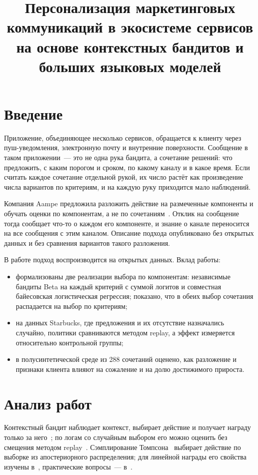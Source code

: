 \documentclass{misisarticle}
\title{Персонализация маркетинговых коммуникаций в экосистеме сервисов на основе контекстных бандитов и больших языковых моделей}
\begin{document}
\maketitle

\section{Введение}

Приложение, объединяющее несколько сервисов, обращается к клиенту через пуш-уведомления, электронную почту и внутренние поверхности. Сообщение в таком приложении~--- это не одна рука бандита, а сочетание решений: что предложить, с каким порогом и сроком, по какому каналу и в какое время. Если считать каждое сочетание отдельной рукой, их число растёт как произведение числа вариантов по критериям, и на каждую руку приходится мало наблюдений.

Компания Aampe предложила разложить действие на размеченные компоненты и обучать оценки по компонентам, а не по сочетаниям~\cite{abboud2025}. Отклик на сообщение тогда сообщает что-то о каждом его компоненте, и знание о канале переносится на все сообщения с этим каналом. Описание подхода опубликовано без открытых данных и без сравнения вариантов такого разложения.

В работе подход воспроизводится на открытых данных. Вклад работы:
\begin{itemize}
  \item формализованы две реализации выбора по компонентам: независимые бандиты Beta на каждый критерий с суммой логитов и совместная байесовская логистическая регрессия; показано, что в обеих выбор сочетания распадается на выбор по критериям;
  \item на данных Starbucks, где предложения и их отсутствие назначались случайно, политики сравниваются методом replay, а эффект измеряется относительно контрольной группы;
  \item в полусинтетической среде из 288 сочетаний оценено, как разложение и признаки клиента влияют на сожаление и на долю достижимого прироста.
\end{itemize}

\section{Анализ работ}

Контекстный бандит наблюдает контекст, выбирает действие и получает награду только за него~\cite{li2010}; по логам со случайным выбором его можно оценить без смещения методом replay~\cite{li2011}. Сэмплирование Томпсона~\cite{thompson1933} выбирает действие по выборке из апостериорного распределения; для линейной награды его свойства изучены в~\cite{agrawal2013}, практические вопросы~--- в~\cite{russo2018}.
\end{document}
